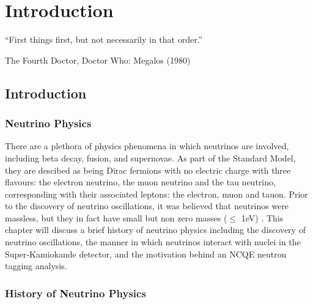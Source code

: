 \chapter{Introduction}
\label{chp:intro}
\epigraph{``First things first, but not necessarily in that order.''}{The Fourth Doctor, Doctor Who: Megalos (1980)}
\section{Introduction}

\subsection{Neutrino Physics}

There are a plethora of physics phenomena in which neutrinos are involved, including beta decay, fusion, and supernovae. As part of the Standard Model, they are descibed as being Dirac fermions with no electric charge with three flavours: the electron neutrino, the muon neutrino and the tau neutrino, corresponding with their associated leptons: the electron, muon and tauon. Prior to the discovery of neutrino oscillations, it was believed that neutrinos were massless, but they in fact have small but non zero masses ($\le$ 1eV) \cite{Aker_2019}. This chapter will discuss a brief history of neutrino physics including the discovery of neutrino oscillations, the manner in which neutrinos interact with nuclei in the Super-Kamiokande detector, and the motivation behind an NCQE neutron tagging analysis.

\subsection{History of Neutrino Physics}

